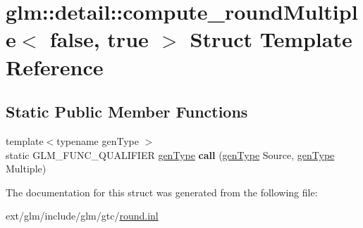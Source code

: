 \hypertarget{structglm_1_1detail_1_1compute__round_multiple_3_01false_00_01true_01_4}{\section{glm\-:\-:detail\-:\-:compute\-\_\-round\-Multiple$<$ false, true $>$ Struct Template Reference}
\label{structglm_1_1detail_1_1compute__round_multiple_3_01false_00_01true_01_4}
}
\subsection*{Static Public Member Functions}
\begin{DoxyCompactItemize}
\item 
\hypertarget{structglm_1_1detail_1_1compute__round_multiple_3_01false_00_01true_01_4_a9f9791732bf5427c856feac9fed810da}{{\footnotesize template$<$typename gen\-Type $>$ }\\static G\-L\-M\-\_\-\-F\-U\-N\-C\-\_\-\-Q\-U\-A\-L\-I\-F\-I\-E\-R \hyperlink{structglm_1_1detail_1_1gen_type}{gen\-Type} {\bfseries call} (\hyperlink{structglm_1_1detail_1_1gen_type}{gen\-Type} Source, \hyperlink{structglm_1_1detail_1_1gen_type}{gen\-Type} Multiple)}\label{structglm_1_1detail_1_1compute__round_multiple_3_01false_00_01true_01_4_a9f9791732bf5427c856feac9fed810da}

\end{DoxyCompactItemize}


The documentation for this struct was generated from the following file\-:\begin{DoxyCompactItemize}
\item 
ext/glm/include/glm/gtc/\hyperlink{round_8inl}{round.\-inl}\end{DoxyCompactItemize}
